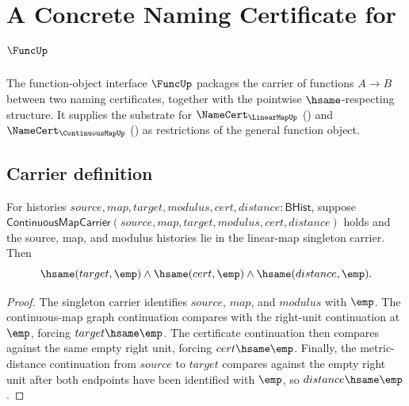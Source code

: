\chapter{A Concrete Naming Certificate for $\FuncUp$}
\label{ch:concrete-instances-funcobj-namecert}

The function-object interface $\FuncUp$ packages the carrier of functions $A \to B$ between two naming certificates, together with the pointwise $\hsame$-respecting structure. It supplies the substrate for $\NameCert_{\LinearMapUp}$ () and $\NameCert_{\ContinuousMapUp}$ () as restrictions of the general function object.

\section{Carrier definition}
\label{sec:funcobj-carrier}

\begin{theorem}
\label{thm:funcobj-linear-singleton-continuous-map-components-empty}
For histories $source,map,target,modulus,cert,distance:\mathsf{BHist}$, suppose
$\mathsf{ContinuousMapCarrier}(source,map,target,modulus,cert,distance)$ holds
and the source, map, and modulus histories lie in the linear-map singleton
carrier. Then
$$
\hsame(target,\emp)\land\hsame(cert,\emp)\land\hsame(distance,\emp).
$$
\end{theorem}
\begin{proof}
The singleton carrier identifies $source$, $map$, and $modulus$ with $\emp$.
The continuous-map graph continuation compares with the right-unit
continuation at $\emp$, forcing $target\hsame\emp$. The certificate
continuation then compares against the same empty right unit, forcing
$cert\hsame\emp$. Finally, the metric-distance continuation from $source$ to
$target$ compares against the empty right unit after both endpoints have been
identified with $\emp$, so $distance\hsame\emp$.
\end{proof}

